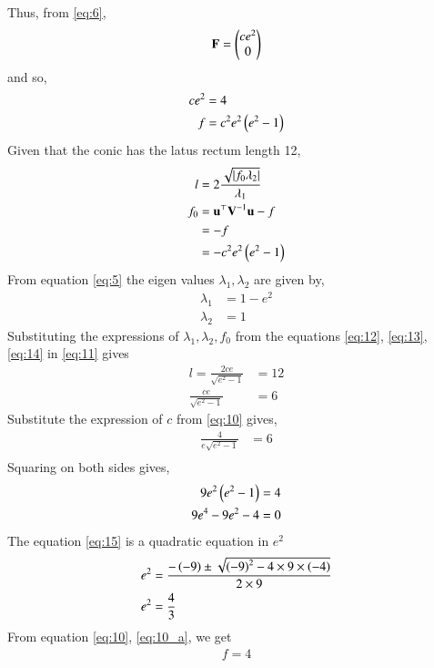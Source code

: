 \documentclass[journal,12pt,twocolumn]{IEEEtran}
\begin{document}
\begin{enumerate}
Thus, from \eqref{eq:6},
\begin{align}
\mathbf{F} = \begin{pmatrix}ce^2\\0\end{pmatrix}
\label{eq:9}
\end{align}
and so,
\begin{align}
ce^2 &= 4
\label{eq:10}\\
f &= c^2e^2\left(e^2-1\right)
\label{eq:10_a}
\end{align}
Given that the conic has the latus rectum length 12,
\begin{align}
l &= 2\frac{\sqrt{\left\vert f_0\lambda_2\right\vert}}{\lambda_1}
\label{eq:11}\\
f_0 &= \mathbf{u}^\top\mathbf{V}^{-1}\mathbf{u} - f\\
&= -f\\
&= -c^2e^2\left(e^2-1\right)
\label{eq:12}
\end{align}
From equation \eqref{eq:5} the eigen values $\lambda_1, \lambda_2$ are given by,
\begin{align}
\lambda_1 &= 1-e^2
\label{eq:13}\\
\lambda_2 &= 1
\label{eq:14}
\end{align}
Substituting the expressions of $\lambda_1,\lambda_2, f_0$ from the equations \eqref{eq:12}, \eqref{eq:13}, \eqref{eq:14} in \eqref{eq:11} gives
\begin{align}
l = \frac{2ce}{\sqrt{e^2-1}} &= 12\\
\frac{ce}{\sqrt{e^2-1}} &= 6
\end{align}
Substitute the expression of $c$ from \eqref{eq:10} gives,
\begin{align}
\frac{4}{e\sqrt{e^2-1}} &= 6\\
\end{align}
Squaring on both sides gives,
\begin{align}
9e^2\left(e^2-1\right) &= 4\\
9e^4-9e^2-4 &= 0
\label{eq:15}
\end{align}
The equation \eqref{eq:15} is a quadratic equation in $e^2$
\begin{align}
e^2 &= \frac{-\left(-9\right)\pm\sqrt{\left(-9\right)^2-4\times9\times\left(-4\right)}}{2\times9}\\
e^2 &= \frac{4}{3}
\end{align}
From equation \eqref{eq:10}, \eqref{eq:10_a}, we get
\begin{align}
f = 4
\end{align} 


\end{enumerate}
\end{document}
